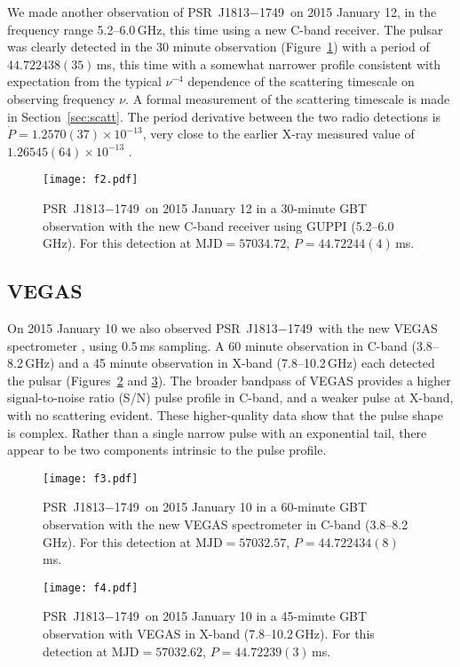 \documentclass[twocolumn]{aastex62}
\newcommand\psr{PSR~J1813$-$1749}
\begin{document}
We made another observation of \psr\ on 2015 January 12, in the
frequency range 5.2--6.0\,GHz, this time using a new C-band receiver.
The pulsar was clearly detected in the 30 minute observation
(Figure~\ref{fig:fig2}) with a period of $44.722438(35)$\,ms, this
time with a somewhat narrower profile consistent with expectation
from the typical $\nu^{-4}$ dependence of the scattering timescale
on observing frequency $\nu$.  A formal measurement of the scattering
timescale is made in Section~\ref{sec:scatt}.  The period derivative
between the two radio detections is $\dot P = 1.2570(37)\times10^{-13}$,
very close to the earlier X-ray measured value of
$1.26545(64)\times10^{-13}$ \citep{hal12}.

\begin{figure}
\centerline{
\texttt{[image: f2.pdf]}
}
\caption{\psr\ on 2015 January 12 in a 30-minute GBT observation
with the new C-band receiver using GUPPI (5.2--6.0\,GHz).
For this detection at $\mbox{MJD} = 57034.72$, $P = 44.72244(4)$\,ms.
}
\label{fig:fig2}
\end{figure}

\subsection{VEGAS\label{sec:VEGAS}}

On 2015 January 10 we also observed \psr\ with the new VEGAS
spectrometer \citep{pbb+15}, using 0.5\,ms sampling.  A 60 minute
observation in C-band (3.8--8.2\,GHz) and a 45 minute observation
in X-band (7.8--10.2\,GHz) each detected the pulsar (Figures~\ref{fig:fig3}
and \ref{fig:fig4}).  The broader bandpass of VEGAS provides a
higher signal-to-noise ratio (S/N) pulse profile in C-band, and
a weaker pulse at X-band, with no scattering evident.  These
higher-quality data show that the pulse shape is complex.  Rather
than a single narrow pulse with an exponential tail, there appear
to be two components intrinsic to the pulse profile.

\begin{figure}
\centerline{
\texttt{[image: f3.pdf]}
}
\caption{\psr\ on 2015 January 10 in a 60-minute GBT observation
with the new VEGAS spectrometer in C-band (3.8--8.2\,GHz).
For this detection at $\mbox{MJD} = 57032.57$, $P = 44.722434(8)$\,ms.
}
\label{fig:fig3}
\end{figure}

\begin{figure}
\centerline{
\texttt{[image: f4.pdf]}
}
\caption{\psr\ on 2015 January 10 in a 45-minute GBT observation
with VEGAS in X-band (7.8--10.2\,GHz).
For this detection at $\mbox{MJD} = 57032.62$, $P = 44.72239(3)$\,ms.
}
\label{fig:fig4}
\end{figure}
\end{document}
